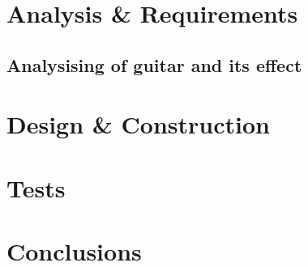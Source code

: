 %
\part{Analysis \& Requirements}\label{pt:analysis} \glsresetall
 \graphicspath{{figures/analysing/}}
 \chapter{Analysising of guitar and its effect}\label{ch:analysing}
 \label{sec:electric_guitar_theory} 
 \label{sec:effects}
\label{sec:platform_comparing}


\part{Design \& Construction}\label{pt:design} 
 
%
\part{Tests}\label{pt:tests} 
\part{Conclusions}\label{pt:conclusions} 
%

